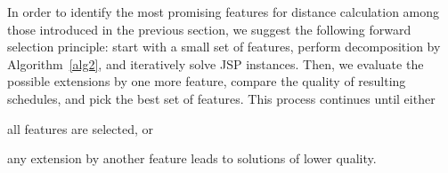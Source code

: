 \documentclass[runningheads]{llncs}
\begin{document}
In order to identify the most promising features for distance calculation among those introduced in the previous section,
we suggest the following forward selection principle:
start with a small set of features, perform decomposition by Algorithm~\ref{alg2},
and iteratively solve JSP instances.
Then, we evaluate the possible extensions by one more feature,
compare the quality of resulting schedules, and pick the best set of features. 
This process continues until either 
\begin{enumerate*}[label=\emph{(\roman*)}]
  \item all features are selected, or 
  \item any extension by another feature leads to solutions of lower quality.
\end{enumerate*}

\end{document}
